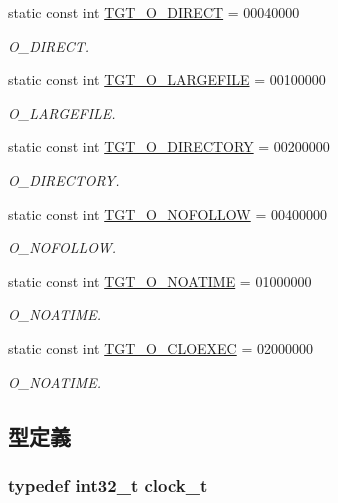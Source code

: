 \begin{DoxyCompactItemize}
static const int \hyperlink{classArmLinux32_ae5d685a6a2ee8c6fe0ede370f0bec588}{TGT\_\-O\_\-DIRECT} = 00040000
\begin{DoxyCompactList}\small\item\em O\_\-DIRECT. \item\end{DoxyCompactList}\item 
static const int \hyperlink{classArmLinux32_a9600e092a6309f94d92129ce5f85b945}{TGT\_\-O\_\-LARGEFILE} = 00100000
\begin{DoxyCompactList}\small\item\em O\_\-LARGEFILE. \item\end{DoxyCompactList}\item 
static const int \hyperlink{classArmLinux32_a1f10d158ad65ad6389078ba44629788a}{TGT\_\-O\_\-DIRECTORY} = 00200000
\begin{DoxyCompactList}\small\item\em O\_\-DIRECTORY. \item\end{DoxyCompactList}\item 
static const int \hyperlink{classArmLinux32_a9c27f68ab31ddfdd3e35800ea1f02a89}{TGT\_\-O\_\-NOFOLLOW} = 00400000
\begin{DoxyCompactList}\small\item\em O\_\-NOFOLLOW. \item\end{DoxyCompactList}\item 
static const int \hyperlink{classArmLinux32_a0ee8b0c23c2babc48e978e872b03c82c}{TGT\_\-O\_\-NOATIME} = 01000000
\begin{DoxyCompactList}\small\item\em O\_\-NOATIME. \item\end{DoxyCompactList}\item 
static const int \hyperlink{classArmLinux32_a34aa7ec867a12296e12a851c47fb56d4}{TGT\_\-O\_\-CLOEXEC} = 02000000
\begin{DoxyCompactList}\small\item\em O\_\-NOATIME. \item\end{DoxyCompactList}\end{DoxyCompactItemize}


\subsection{型定義}
\hypertarget{classArmLinux32_af9bbc36b03eced2f192e46d55e703b58}{
\subsubsection[{clock\_\-t}]{\setlength{\rightskip}{0pt plus 5cm}typedef int32\_\-t {\bf clock\_\-t}}}
\label{classArmLinux32_af9bbc36b03eced2f192e46d55e703b58}


